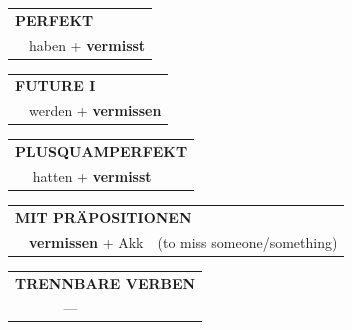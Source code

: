 \documentclass[10pt,a4paper]{revtex4-2}
\begin{document}
\begin{verbbox}
\vspace{10pt}

\begin{tabular}{rl}
\multicolumn{2}{l}{\textbf{PERFEKT}}\\
& haben + \textbf{vermisst}\\
\end{tabular}
\hfill
\begin{tabular}{rl}
\multicolumn{2}{l}{\textbf{FUTURE I}}\\
& werden + \textbf{vermissen}\\
\end{tabular}
\hfill
\begin{tabular}{rl}
\multicolumn{2}{l}{\textbf{PLUSQUAMPERFEKT}}\\
& hatten + \textbf{vermisst}\\
\end{tabular}

\vspace{10pt}

\begin{tabular}{lll}
\multicolumn{3}{l}{\textbf{MIT PRÄPOSITIONEN}}\\
& \textbf{vermissen} + Akk & (to miss someone/something)\\
\end{tabular}
\hfill
\begin{tabular}{lll}
\multicolumn{3}{l}{\textbf{TRENNBARE VERBEN}}\\
& --- & \\
\end{tabular}
\vspace{-5pt}
\end{verbbox}
\end{document}

